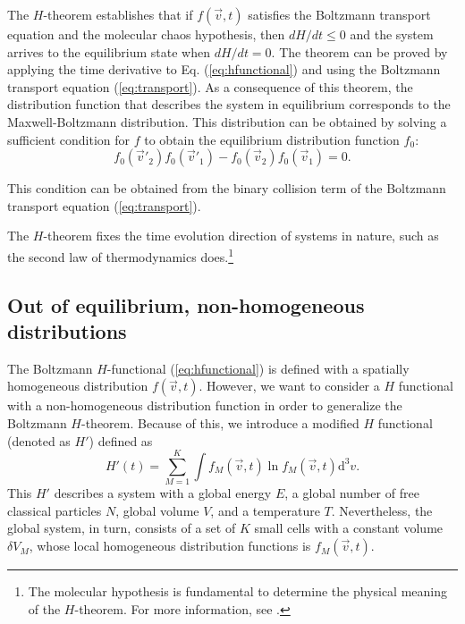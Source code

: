 The $H$-theorem establishes that if $f(\vec{v},t)$ satisfies the Boltzmann
transport equation and the molecular chaos hypothesis, then
$dH/dt\leq0$ and the system arrives to the equilibrium state when
$dH/dt=0$.
The theorem can be proved by applying the time derivative
to Eq. (\ref{eq:hfunctional}) and using the Boltzmann transport equation
(\ref{eq:transport}). As a consequence of this theorem, the distribution function
that describes the system in equilibrium corresponds to the Maxwell-Boltzmann
distribution. This distribution can be obtained by solving a sufficient
condition for $f$ to obtain the equilibrium distribution function $f_0$:
%
\begin{equation}
    f_0(\vec{v}'_2)f_0(\vec{v}'_1)- f_0(\vec{v}_2)f_0(\vec{v}_1)=0.
\end{equation}
%

This condition can be obtained from the binary collision term of the Boltzmann
transport equation (\ref{eq:transport}).

The $H$-theorem fixes the time evolution direction of systems in nature, such
as the second law of thermodynamics does.\footnote{The molecular hypothesis is %
fundamental to determine the physical meaning of the $H$-theorem. For more %
information, see \cite{bib:huang}.}

\subsection{Out of equilibrium, non-homogeneous distributions}

The Boltzmann $H$-functional (\ref{eq:hfunctional}) is defined with a spatially
homogeneous distribution $f(\vec{v},t)$. However, we want to consider a $H$
functional with a non-homogeneous distribution function in order to generalize
the Boltzmann $H$-theorem. Because of this, we introduce a modified $H$
functional (denoted as $H'$) defined as
%
\begin{equation}\label{eq:CH2}
   H'(t)=\sum_{M=1}^{K}\int f_M(\vec{v},t) \ln f_M(\vec{v},t)\mathrm{d}^3v.
\end{equation}
%
This $H'$ describes a system with a global energy $E$, a global number of free
classical particles $N$, global volume $V$, and a temperature $T$. Nevertheless,
the global system, in turn, consists of a set of $K$ small cells with a constant
volume $\delta V_M$, whose local homogeneous distribution functions is
$f_{M}(\vec{v},t)$.


